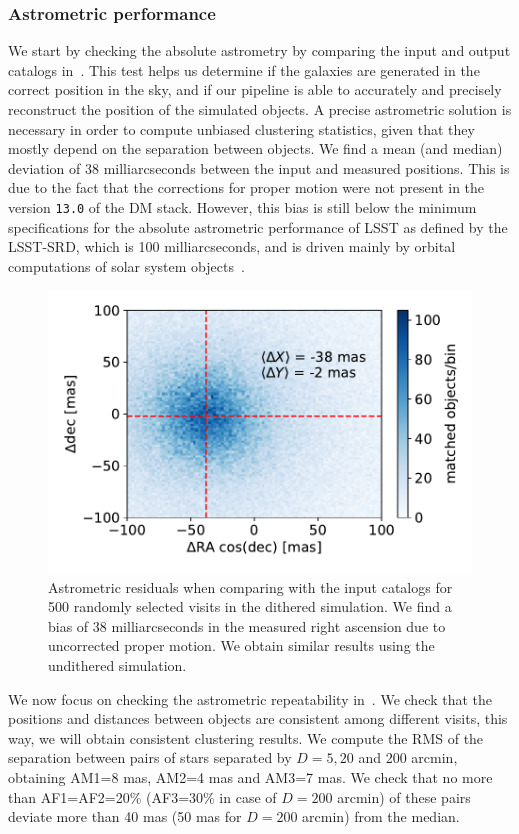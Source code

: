 \documentclass[\docopts]{\docclass}
\begin{document}
\subsubsection{Astrometric performance}
\label{sssec:astrometry}
We start by checking the absolute astrometry by comparing the input and output catalogs in~. This test helps us determine if the galaxies are generated in the correct position in the sky, and if our pipeline is able to accurately and precisely reconstruct the position of the simulated objects. A precise astrometric solution is necessary in order to compute unbiased clustering statistics, given that they mostly depend on the separation between objects. We find a mean (and median) deviation of 38 milliarcseconds between the input and measured positions. This is due to the fact that the corrections for proper motion were not present in the version \texttt{13.0} of the DM stack. However, this bias is still below the minimum specifications for the absolute astrometric performance of LSST as defined by the LSST-SRD, which is 100 milliarcseconds, and is driven mainly by orbital computations of solar system objects~\citep{LPM-17}. 

\begin{figure}
\centering
\includegraphics[width=0.9\columnwidth]{astrometric_residuals_single_visit_2d}
\caption{Astrometric residuals when comparing with the input catalogs for 500 randomly selected visits in the dithered simulation. We find a bias of 38 milliarcseconds in the measured right ascension due to uncorrected proper motion. We obtain similar results using the undithered simulation.}
\label{fig:AA1}
\end{figure}

We now focus on checking the astrometric repeatability in~. We check that the positions and distances between objects are consistent among different visits, this way, we will obtain consistent clustering results. We compute the RMS of the separation between pairs of stars separated by $D=5, 20$ and $200$ arcmin, obtaining AM1=8 mas, AM2=4 mas and AM3=7 mas. We check that no more than AF1=AF2=20\% (AF3=30\% in case of $D=200$ arcmin) of these pairs deviate more than 40 mas (50 mas for $D=200$ arcmin) from the median.
\end{document}
